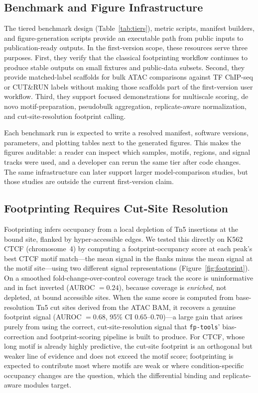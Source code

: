 \documentclass[biomedinformatics,article,submit,pdftex,moreauthors]{Definitions/mdpi}
\begin{document}
\subsection{Benchmark and Figure Infrastructure}

The tiered benchmark design (Table~\ref{tab:tiers}), metric scripts, manifest
builders, and figure-generation scripts provide an executable path from public
inputs to publication-ready outputs. In the first-version scope, these resources
serve three purposes. First, they verify that the classical footprinting workflow
continues to produce stable outputs on small fixtures and public-data subsets.
Second, they provide matched-label scaffolds for bulk ATAC comparisons against
TF ChIP-seq or CUT\&RUN labels without making those scaffolds part of the
first-version user workflow.
Third, they support focused demonstrations for multiscale scoring, de novo
motif-preparation, pseudobulk aggregation, replicate-aware normalization, and
cut-site-resolution footprint calling.

Each benchmark run is expected to write a resolved manifest, software versions,
parameters, and plotting tables next to the generated figures. This makes the
figures auditable: a reader can inspect which samples, motifs, regions, and signal
tracks were used, and a developer can rerun the same tier after code changes. The
same infrastructure can later support larger model-comparison studies, but those
studies are outside the current first-version claim.

\subsection{Footprinting Requires Cut-Site Resolution}

Footprinting infers occupancy from a local depletion of Tn5 insertions at the bound
site, flanked by hyper-accessible edges. We tested this directly on K562 CTCF
(chromosome~4) by computing a footprint-occupancy score at each peak's best CTCF
motif match---the mean signal in the flanks minus the mean signal at the motif
site---using two different signal representations
(Figure~\ref{fig:footprint}). On a smoothed fold-change-over-control coverage
track the score is uninformative and in fact inverted (AUROC $=0.24$), because
coverage is \emph{enriched}, not depleted, at bound accessible sites. When the same
score is computed from base-resolution Tn5 cut sites derived from the ATAC BAM, it
recovers a genuine footprint signal (AUROC $=0.68$, 95\% CI $0.65$--$0.70$)---a
large gain that arises purely from using the correct, cut-site-resolution signal
that \texttt{fp-tools}' bias-correction and footprint-scoring pipeline is built to
produce. For CTCF, whose long motif is already highly predictive, the cut-site
footprint is an orthogonal but weaker line of evidence and does not exceed the motif
score; footprinting is expected to contribute most where motifs are weak or where
condition-specific occupancy changes are the question, which the differential
binding and replicate-aware modules target.
\end{document}
